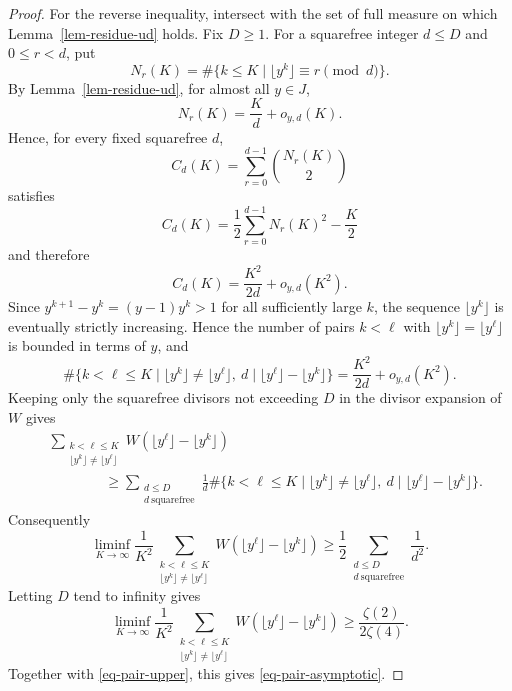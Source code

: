 \documentclass[10pt,a4paper]{amsart}
\begin{document}
\begin{proof}
        For the reverse inequality, intersect with the set of full measure on which Lemma~\ref{lem-residue-ud} holds. Fix $D\ge1$. For a squarefree integer $d\le D$ and $0\le r<d$, put
        $$
        N_r(K)=\#\{k\le K\mid \lfloor y^k\rfloor\equiv r\pmod d\}.
        $$
        By Lemma~\ref{lem-residue-ud}, for almost all $y\in J$,
        $$
        N_r(K)=\frac Kd+o_{y,d}(K).
        $$
        Hence, for every fixed squarefree $d$,
        $$
        C_d(K)=\sum_{r=0}^{d-1}\binom{N_r(K)}2
        $$
        satisfies
        $$
        C_d(K)=\frac12\sum_{r=0}^{d-1}N_r(K)^2-\frac K2
        $$
        and therefore
        $$
        C_d(K)=\frac{K^2}{2d}+o_{y,d}(K^2).
        $$
        Since $y^{k+1}-y^k=(y-1)y^k>1$ for all sufficiently large $k$, the sequence $\lfloor y^k\rfloor$ is eventually strictly increasing. Hence the number of pairs $k<\ell$ with $\lfloor y^k\rfloor=\lfloor y^\ell\rfloor$ is bounded in terms of $y$, and
        $$
        \#\{k<\ell\le K\mid \lfloor y^k\rfloor\ne\lfloor y^\ell\rfloor,\ d\mid \lfloor y^\ell\rfloor-\lfloor y^k\rfloor\}
        =\frac{K^2}{2d}+o_{y,d}(K^2).
        $$
        Keeping only the squarefree divisors not exceeding $D$ in the divisor expansion of $W$ gives
        $$
        \begin{aligned}
            &\sum_{\substack{k<\ell\le K\\ \lfloor y^k\rfloor\ne\lfloor y^\ell\rfloor}}
            W\!\left(\lfloor y^\ell\rfloor-\lfloor y^k\rfloor\right)\\
            &\qquad\qquad\ge
            \sum_{\substack{d\le D\\d\ \mathrm{squarefree}}}\frac1d
            \#\{k<\ell\le K\mid \lfloor y^k\rfloor\ne\lfloor y^\ell\rfloor,\ d\mid \lfloor y^\ell\rfloor-\lfloor y^k\rfloor\}.
        \end{aligned}
        $$
        Consequently
        $$
        \liminf_{K\to\infty}\frac1{K^2}
        \sum_{\substack{k<\ell\le K\\ \lfloor y^k\rfloor\ne\lfloor y^\ell\rfloor}}
        W\!\left(\lfloor y^\ell\rfloor-\lfloor y^k\rfloor\right)
        \ge
        \frac12\sum_{\substack{d\le D\\d\ \mathrm{squarefree}}}\frac1{d^2}.
        $$
        Letting $D$ tend to infinity gives
        $$
        \liminf_{K\to\infty}\frac1{K^2}
        \sum_{\substack{k<\ell\le K\\ \lfloor y^k\rfloor\ne\lfloor y^\ell\rfloor}}
        W\!\left(\lfloor y^\ell\rfloor-\lfloor y^k\rfloor\right)
        \ge \frac{\zeta(2)}{2\zeta(4)}.
        $$
        Together with \eqref{eq-pair-upper}, this gives \eqref{eq-pair-asymptotic}.
    \end{proof}
\end{document}
